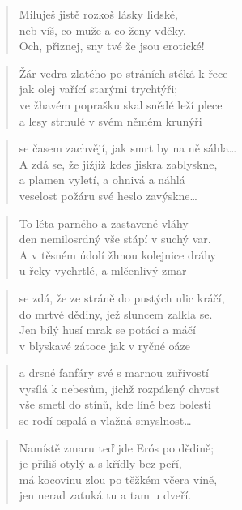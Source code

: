 \documentclass{book}
\begin{document}
\begin{verse}
Miluješ jistě rozkoš lásky lidské,\\
neb víš, co muže a co ženy vděky.\\
Och, přiznej, sny tvé že jsou erotické!
\end{verse}
\newpage
{}
\begin{verse}
Žár vedra zlatého po stráních stéká k řece\\
jak olej vařící starými trychtýři;\\
ve žhavém poprašku skal snědé leží plece\\
a lesy strnulé v svém němém krunýři
\end{verse}
\begin{verse}
se časem zachvějí, jak smrt by na ně sáhla\ldots\\
A zdá se, že jižjiž kdes jiskra zablyskne,\\
a plamen vyletí, a ohnivá a náhlá\\
veselost požáru své heslo zavýskne\ldots
\end{verse}
\begin{verse}
To léta parného a zastavené vláhy\\
den nemilosrdný vše stápí v suchý var.\\
A v těsném údolí žhnou kolejnice dráhy\\
u řeky vychrtlé, a mlčenlivý zmar
\end{verse}
\begin{verse}
se zdá, že ze stráně do pustých ulic kráčí,\\
do mrtvé dědiny, jež sluncem zalkla se.\\
Jen bílý husí mrak se potácí a máčí\\
v blyskavé zátoce jak v ryčné oáze
\end{verse}
\begin{verse}
a drsné fanfáry své s marnou zuřivostí\\
vysílá k nebesům, jichž rozpálený chvost\\
vše smetl do stínů, kde líně bez bolesti\\
se rodí ospalá a vlažná smyslnost\ldots
\end{verse}
\begin{verse}
Namístě zmaru teď jde Erós po dědině;\\
je příliš otylý a s křídly bez peří,\\
má kocovinu zlou po těžkém včera víně,\\
jen nerad zaťuká tu a tam u dveří.
\end{verse}
\end{document}
